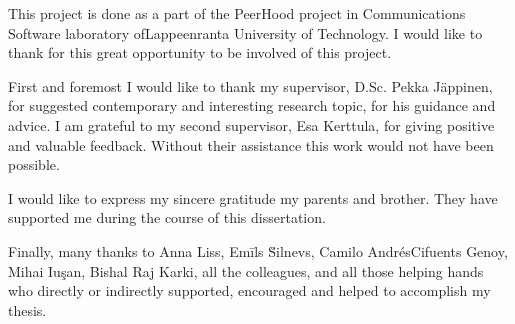 %
This project is done as a part of the PeerHood project in Communications Software laboratory ofLappeenranta University of Technology.
%
I would like to thank for this great opportunity to be involved of this project.

%
First and foremost I would like to thank my supervisor, D.Sc. Pekka J\"appinen, for suggested contemporary and interesting research topic, for his guidance and advice. 
%
I am grateful to my second supervisor, Esa Kerttula, for giving positive and valuable feedback. 
%
Without their assistance this work would not have been possible.

%
I would like to express my sincere gratitude my parents and brother.
%
They have supported me during the course of this dissertation.

%
Finally, many thanks to Anna Liss, Em\={i}ls \u{S}i\cb l\cb nevs, Camilo Andr\'{e}sCifuents Genoy, Mihai Iu\c{s}an, Bishal Raj Karki, all the colleagues, and all those helping hands who directly or indirectly supported, encouraged and helped to accomplish my thesis.